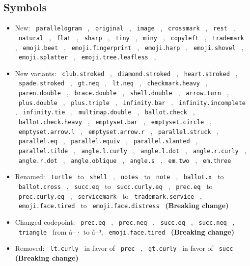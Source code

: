 \subsection{Symbols}\label{symbols}

\begin{itemize}
\tightlist
\item
  New: \texttt{\ parallelogram\ } , \texttt{\ original\ } ,
  \texttt{\ image\ } , \texttt{\ crossmark\ } , \texttt{\ rest\ } ,
  \texttt{\ natural\ } , \texttt{\ flat\ } , \texttt{\ sharp\ } ,
  \texttt{\ tiny\ } , \texttt{\ miny\ } , \texttt{\ copyleft\ } ,
  \texttt{\ trademark\ } , \texttt{\ emoji.beet\ } ,
  \texttt{\ emoji.fingerprint\ } , \texttt{\ emoji.harp\ } ,
  \texttt{\ emoji.shovel\ } , \texttt{\ emoji.splatter\ } ,
  \texttt{\ emoji.tree.leafless\ } ,
\item
  New variants: \texttt{\ club.stroked\ } , \texttt{\ diamond.stroked\ }
  , \texttt{\ heart.stroked\ } , \texttt{\ spade.stroked\ } ,
  \texttt{\ gt.neq\ } , \texttt{\ lt.neq\ } ,
  \texttt{\ checkmark.heavy\ } , \texttt{\ paren.double\ } ,
  \texttt{\ brace.double\ } , \texttt{\ shell.double\ } ,
  \texttt{\ arrow.turn\ } , \texttt{\ plus.double\ } ,
  \texttt{\ plus.triple\ } , \texttt{\ infinity.bar\ } ,
  \texttt{\ infinity.incomplete\ } , \texttt{\ infinity.tie\ } ,
  \texttt{\ multimap.double\ } , \texttt{\ ballot.check\ } ,
  \texttt{\ ballot.check.heavy\ } , \texttt{\ emptyset.bar\ } ,
  \texttt{\ emptyset.circle\ } , \texttt{\ emptyset.arrow.l\ } ,
  \texttt{\ emptyset.arrow.r\ } , \texttt{\ parallel.struck\ } ,
  \texttt{\ parallel.eq\ } , \texttt{\ parallel.equiv\ } ,
  \texttt{\ parallel.slanted\ } , \texttt{\ parallel.tilde\ } ,
  \texttt{\ angle.l.curly\ } , \texttt{\ angle.l.dot\ } ,
  \texttt{\ angle.r.curly\ } , \texttt{\ angle.r.dot\ } ,
  \texttt{\ angle.oblique\ } , \texttt{\ angle.s\ } ,
  \texttt{\ em.two\ } , \texttt{\ em.three\ }
\item
  Renamed: \texttt{\ turtle\ } to \texttt{\ shell\ } ,
  \texttt{\ notes\ } to \texttt{\ note\ } , \texttt{\ ballot.x\ } to
  \texttt{\ ballot.cross\ } , \texttt{\ succ.eq\ } to
  \texttt{\ succ.curly.eq\ } , \texttt{\ prec.eq\ } to
  \texttt{\ prec.curly.eq\ } , \texttt{\ servicemark\ } to
  \texttt{\ trademark.service\ } , \texttt{\ emoji.face.tired\ } to
  \texttt{\ emoji.face.distress\ } \textbf{(Breaking change)}
\item
  Changed codepoint: \texttt{\ prec.eq\ } , \texttt{\ prec.neq\ } ,
  \texttt{\ succ.eq\ } , \texttt{\ succ.neq\ } , \texttt{\ triangle\ }
  from â--· to â--³, \texttt{\ emoji.face.tired\ } \textbf{(Breaking
  change)}
\item
  Removed: \texttt{\ lt.curly\ } in favor of \texttt{\ prec\ } ,
  \texttt{\ gt.curly\ } in favor of \texttt{\ succ\ } \textbf{(Breaking
  change)}
\end{itemize}

